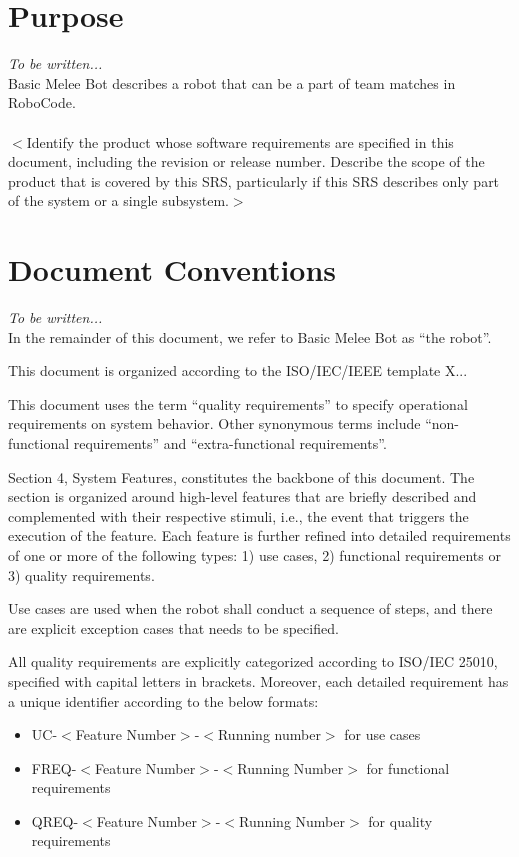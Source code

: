 \documentclass{scrreprt}
\begin{document}
\section{Purpose}
\textit{To be written...}\\

Basic Melee Bot describes a robot that can be a part of team matches in RoboCode.\\\\

$<$Identify the product whose software requirements are specified in this 
document, including the revision or release number. Describe the scope of the 
product that is covered by this SRS, particularly if this SRS describes only 
part of the system or a single subsystem.$>$

\section{Document Conventions}
\textit{To be written...}\\

In the remainder of this document, we refer to Basic Melee Bot as ``the robot''.

This document is organized according to the ISO/IEC/IEEE template X...

This document uses the term ``quality requirements'' to specify operational requirements on system behavior. Other synonymous terms include ``non-functional requirements'' and ``extra-functional requirements''.

Section 4, System Features, constitutes the backbone of this document. The section is organized around high-level features that are briefly described and complemented with their respective stimuli, i.e., the event that triggers the execution of the feature. Each feature is further refined into detailed requirements of one or more of the following types: 1) use cases, 2) functional requirements or 3) quality requirements. 

Use cases are used when the robot shall conduct a sequence of steps, and there are explicit exception cases that needs to be specified.

All quality requirements are explicitly categorized according to ISO/IEC 25010, specified with capital letters in brackets. Moreover, each detailed requirement has a unique identifier according to the below formats: 

\begin{itemize}
\item UC-$<$Feature Number$>$-$<$Running number$>$ for use cases
\item FREQ-$<$Feature Number$>$-$<$Running Number$>$ for functional requirements
\item QREQ-$<$Feature Number$>$-$<$Running Number$>$ for quality requirements
\end{itemize}
\end{document}
